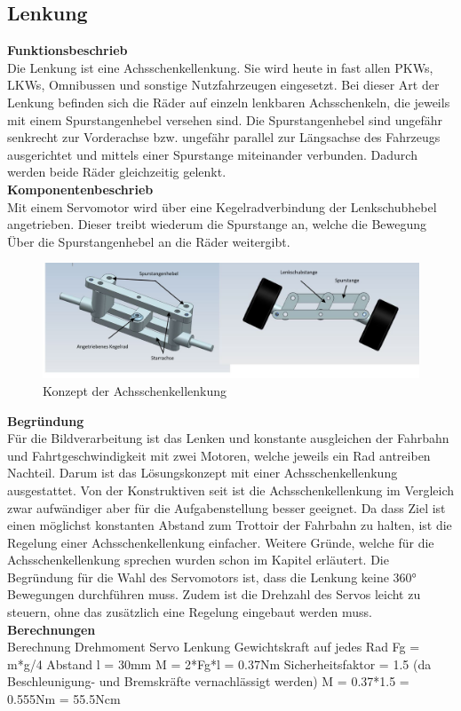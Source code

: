 \subsection{Lenkung}

\textbf{Funktionsbeschrieb}
\\[0.2cm]
Die Lenkung ist eine Achsschenkellenkung. Sie wird heute in fast allen PKWs, LKWs, Omnibussen und sonstige Nutzfahrzeugen eingesetzt. Bei dieser Art der Lenkung befinden sich die Räder auf einzeln lenkbaren Achsschenkeln, die jeweils mit einem Spurstangenhebel versehen sind. Die Spurstangenhebel sind ungefähr senkrecht zur Vorderachse bzw. ungefähr parallel zur Längsachse des Fahrzeugs ausgerichtet und mittels einer Spurstange miteinander verbunden. Dadurch werden beide Räder gleichzeitig gelenkt.\\[0.2cm]
\textbf{Komponentenbeschrieb}
\\[0.2cm]
Mit einem Servomotor wird über eine Kegelradverbindung der Lenkschubhebel angetrieben. Dieser treibt wiederum die Spurstange an, welche die Bewegung Über die Spurstangenhebel an die Räder weitergibt.
\begin{figure}[H]%
\centering
\includegraphics[width=1\textwidth]{03_Loesungskonzept/pictures/Achsschenkellenkung.JPG}
\caption{Konzept der Achsschenkellenkung}
\label{fig:activityRoute}
\end{figure}
\textbf{Begründung}\\[0.2cm]
Für die Bildverarbeitung ist das Lenken und konstante ausgleichen der Fahrbahn und Fahrtgeschwindigkeit mit zwei Motoren, welche jeweils ein Rad antreiben Nachteil. Darum ist das Lösungskonzept mit einer Achsschenkellenkung ausgestattet. Von der Konstruktiven seit ist die Achsschenkellenkung im Vergleich zwar aufwändiger aber für die Aufgabenstellung besser geeignet. Da dass Ziel ist einen möglichst konstanten Abstand zum Trottoir der Fahrbahn zu halten, ist die Regelung einer Achsschenkellenkung einfacher. Weitere Gründe, welche für die Achsschenkellenkung sprechen wurden schon im Kapitel \grqq  erläutert.
Die Begründung für die Wahl des Servomotors ist, dass die Lenkung keine 360° Bewegungen durchführen muss. Zudem ist die Drehzahl des Servos leicht zu steuern, ohne das zusätzlich eine Regelung eingebaut werden muss. 
\textbf{Berechnungen}\\[0.2cm]
Berechnung Drehmoment Servo Lenkung
Gewichtskraft auf jedes Rad Fg = m*g/4
Abstand l = 30mm
M = 2*Fg*l = 0.37Nm
Sicherheitsfaktor = 1.5 (da Beschleunigung- und Bremskräfte vernachlässigt werden)
M = 0.37*1.5 = 0.555Nm = 55.5Ncm\flushleft
